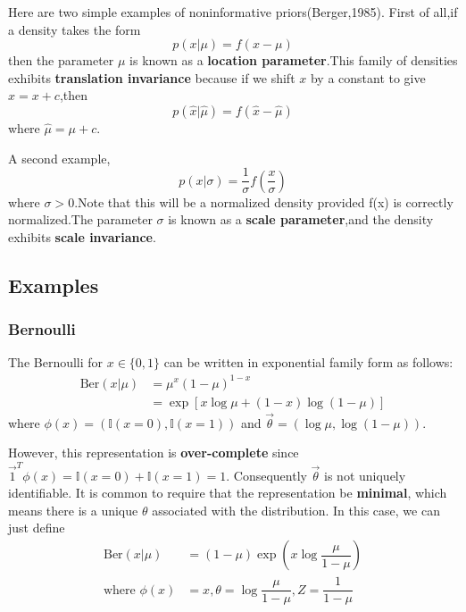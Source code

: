 Here are two simple examples of noninformative priors(Berger,1985).
First of all,if a density takes the form
\begin{equation}
p(x|\mu) = f(x-\mu)
\end{equation}
then the parameter $\mu$ is known as a \textbf{location parameter}.This family of densities exhibits \textbf{translation invariance} because if we shift $x$ by a constant to give $\hat{x} = x+c$,then
\begin{equation}
p(\hat{x}|\hat{\mu}) = f(\hat{x}-\hat{\mu})
\end{equation}
where $\hat{\mu} = \mu +c$.

A second example,
\begin{equation}\label{eqn:density scale parameter}
p(x|\sigma) = \dfrac{1}{\sigma}f(\dfrac{x}{\sigma})
\end{equation}
where $\sigma>0$.Note that this will be a normalized density provided f(x) is correctly normalized.The parameter $\sigma$ is known as a \textbf{scale parameter},and the density exhibits \textbf{scale invariance}.

\subsection{Examples}


\subsubsection{Bernoulli}
The Bernoulli for $x \in \{0,1\}$ can be written in exponential family form as follows:
\begin{equation}\begin{split}
\mathrm{Ber}(x|\mu)& =\mu^x(1-\mu)^{1-x} \\
& =\exp[x\log\mu+(1-x)\log(1-\mu)]
\end{split}\end{equation}
where $\phi(x)=(\mathbb{I}(x=0),\mathbb{I}(x=1))$ and $\vec{\theta}=(\log\mu,\log(1-\mu))$. 

However, this representation is \textbf{over-complete} since $\vec{1}^T\phi(x)=\mathbb{I}(x=0)+\mathbb{I}(x=1)=1$. Consequently $\vec{\theta}$ is not uniquely identifiable. It is common to require that the representation be \textbf{minimal}, which means there is a unique $\theta$ associated with the distribution. In this case, we can just define
\begin{align}
\mathrm{Ber}(x|\mu) & =(1-\mu)\exp\left(x\log\dfrac{\mu}{1-\mu}\right) \\
\text{where } \phi(x) & =x, \theta=\log\dfrac{\mu}{1-\mu}, Z=\dfrac{1}{1-\mu}  \nonumber
\end{align}


